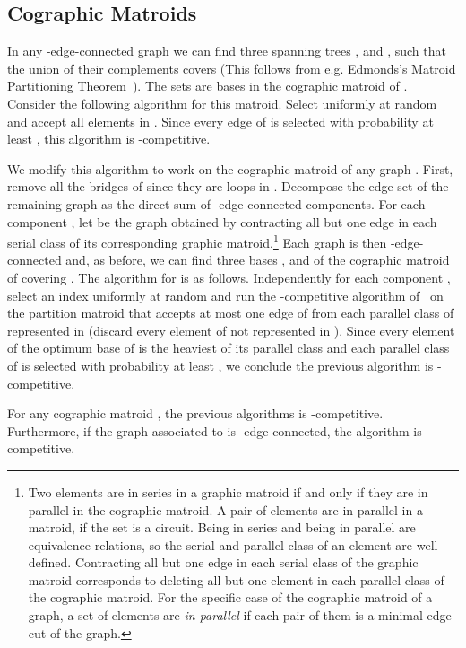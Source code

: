 \documentclass[letterpaper,11pt]{article}
\theoremstyle{definition}
\theoremstyle{remark}
\begin{document}
\subsection{Cographic Matroids}
In any -edge-connected graph  we can find three spanning trees ,  and , such that the union of their complements covers  (This follows from e.g. Edmonds's Matroid Partitioning Theorem~\cite{edmonds1965minimum}). The sets  are bases in the cographic matroid of . Consider the following algorithm for this matroid. Select  uniformly at random and accept all elements in . Since every edge of  is selected with probability at least , this algorithm is -competitive.

We modify this algorithm to work on the cographic matroid  of any graph . First, remove all the bridges of  since they are loops in . Decompose the edge set of the remaining graph as the direct sum of -edge-connected components.  For each component , let  be the graph obtained by contracting all but one edge in each serial class of its corresponding graphic matroid.\footnote{Two elements are in series in a graphic matroid if and only if they are in parallel in the cographic matroid. A pair of elements  are in parallel in a matroid, if the set  is a circuit. Being in series and being in parallel are equivalence relations, so the serial and parallel class of an element are well defined.
Contracting all but one edge in each serial class of the graphic matroid corresponds to deleting all but one element in each parallel class of the cographic matroid. For the specific case of the cographic matroid of a graph, a set of elements are \emph{in parallel} if each pair of them is a minimal edge cut of the graph.}
Each graph  is then -edge-connected and, as before, we can find three bases ,  and  of the cographic matroid of  covering . The algorithm for  is as follows. Independently for each component , select an index  uniformly at random and run the -competitive algorithm of~\cite{babaioff_knapsack_2007} on the partition matroid that accepts at most one edge of  from each parallel class of  represented in  (discard every element of  not represented in ). Since every element of the optimum base of  is the heaviest of its parallel class and each parallel class of  is selected with probability at least , we conclude the previous algorithm is -competitive.

\begin{thm} For any cographic matroid , the previous algorithms is -competitive. Furthermore, if the graph  associated to  is -edge-connected, the algorithm is -competitive.
\end{thm}
\end{document}
